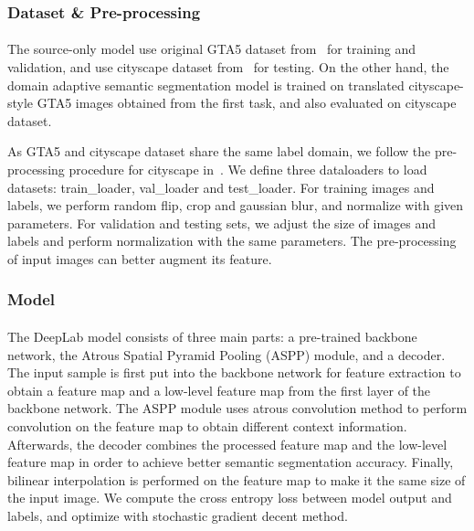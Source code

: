 \subsubsection{Dataset \& Pre-processing}
\paragraph{}
The source-only model use original GTA5 dataset from~\cite{richter2016playing} for training and validation, and use cityscape dataset from~\cite{cordts2016cityscapes} for testing. On the other hand, the domain adaptive semantic segmentation model is trained on translated cityscape-style GTA5 images obtained from the first task, and also evaluated on cityscape dataset.

As GTA5 and cityscape dataset share the same label domain, we follow the pre-processing procedure for cityscape in~\cite{Deeplab}. We define three dataloaders to load datasets: train\_loader, val\_loader and test\_loader. For training images and labels, we perform random flip, crop and gaussian blur, and normalize with given parameters. For validation and testing sets, we adjust the size of images and labels and perform normalization with the same parameters. The pre-processing of input images can better augment its feature.
\subsubsection{Model}
\paragraph{}
The DeepLab model consists of three main parts: a pre-trained backbone network, the Atrous Spatial Pyramid Pooling (ASPP) module, and a decoder. The input sample is first put into the backbone network for feature extraction to obtain a feature map and a low-level feature map from the first layer of the backbone network. The ASPP module uses atrous convolution method to perform convolution on the feature map to obtain different context information. Afterwards, the decoder combines the processed feature map and the low-level feature map in order to achieve better semantic segmentation accuracy. Finally, bilinear interpolation is performed on the feature map to make it the same size of the input image. We compute the cross entropy loss between model output and labels, and optimize with stochastic gradient decent method.

